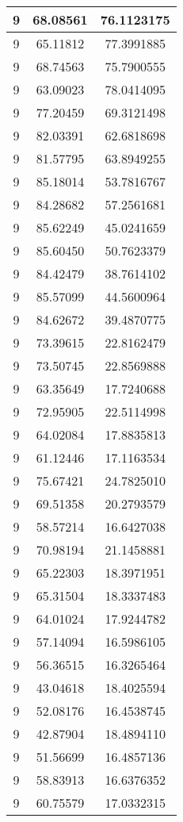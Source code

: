 \documentclass[
]{book}
\begin{document}
\begin{tabular}{c|c|c}
\hline
9 & 68.08561 & 76.1123175\\
\hline
9 & 65.11812 & 77.3991885\\
\hline
9 & 68.74563 & 75.7900555\\
\hline
9 & 63.09023 & 78.0414095\\
\hline
9 & 77.20459 & 69.3121498\\
\hline
9 & 82.03391 & 62.6818698\\
\hline
9 & 81.57795 & 63.8949255\\
\hline
9 & 85.18014 & 53.7816767\\
\hline
9 & 84.28682 & 57.2561681\\
\hline
9 & 85.62249 & 45.0241659\\
\hline
9 & 85.60450 & 50.7623379\\
\hline
9 & 84.42479 & 38.7614102\\
\hline
9 & 85.57099 & 44.5600964\\
\hline
9 & 84.62672 & 39.4870775\\
\hline
9 & 73.39615 & 22.8162479\\
\hline
9 & 73.50745 & 22.8569888\\
\hline
9 & 63.35649 & 17.7240688\\
\hline
9 & 72.95905 & 22.5114998\\
\hline
9 & 64.02084 & 17.8835813\\
\hline
9 & 61.12446 & 17.1163534\\
\hline
9 & 75.67421 & 24.7825010\\
\hline
9 & 69.51358 & 20.2793579\\
\hline
9 & 58.57214 & 16.6427038\\
\hline
9 & 70.98194 & 21.1458881\\
\hline
9 & 65.22303 & 18.3971951\\
\hline
9 & 65.31504 & 18.3337483\\
\hline
9 & 64.01024 & 17.9244782\\
\hline
9 & 57.14094 & 16.5986105\\
\hline
9 & 56.36515 & 16.3265464\\
\hline
9 & 43.04618 & 18.4025594\\
\hline
9 & 52.08176 & 16.4538745\\
\hline
9 & 42.87904 & 18.4894110\\
\hline
9 & 51.56699 & 16.4857136\\
\hline
9 & 58.83913 & 16.6376352\\
\hline
9 & 60.75579 & 17.0332315\\

\end{tabular}
\end{document}
